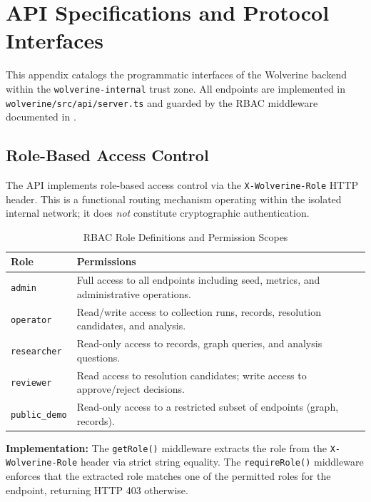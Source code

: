 \chapter{API Specifications and Protocol Interfaces}
\label{app:api-specifications}

This appendix catalogs the programmatic interfaces of the Wolverine backend within the \texttt{wolverine-internal} trust zone. All endpoints are implemented in \texttt{wolverine/src/api/server.ts} and guarded by the RBAC middleware documented in .

\section{Role-Based Access Control}
\label{app-sec:rbac}

The API implements role-based access control via the \texttt{X-Wolverine-Role} HTTP header. This is a functional routing mechanism operating within the isolated internal network; it does \textit{not} constitute cryptographic authentication.

\begin{table}[htbp]
\centering
\begin{tabular}{p{} p{}}
\toprule
\textbf{Role} & \textbf{Permissions} \\
\midrule
\texttt{admin} & Full access to all endpoints including seed, metrics, and administrative operations. \\
\texttt{operator} & Read/write access to collection runs, records, resolution candidates, and analysis. \\
\texttt{researcher} & Read-only access to records, graph queries, and analysis questions. \\
\texttt{reviewer} & Read access to resolution candidates; write access to approve/reject decisions. \\
\texttt{public\_demo} & Read-only access to a restricted subset of endpoints (graph, records). \\
\bottomrule
\end{tabular}
\caption{RBAC Role Definitions and Permission Scopes}
\label{tab:app-rbac-roles}
\end{table}

\textbf{Implementation:} The \texttt{getRole()} middleware extracts the role from the \texttt{X-Wolverine-Role} header via strict string equality. The \texttt{requireRole()} middleware enforces that the extracted role matches one of the permitted roles for the endpoint, returning HTTP 403 otherwise.

